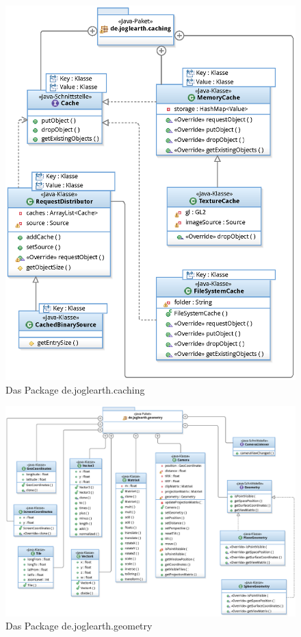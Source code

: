 \documentclass[10pt]{scrreprt}
\begin{document}
\begin{figure}[!htb]
\begin{center}
	\includegraphics[scale=0.55]{de_joglearth_caching.eps}
\end{center}
\caption{Das Package de.joglearth.caching}
\end{figure}


\begin{figure}[!htb]
\begin{center}
	\includegraphics[scale=0.55]{de_joglearth_geometry.eps}
\end{center}
\caption{Das Package de.joglearth.geometry}
\end{figure}
\end{document}
